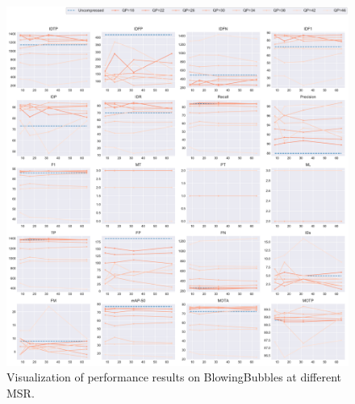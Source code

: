 \begin{figure}[!htbp]
\centering
\includegraphics[width=1.0\linewidth]{img/appendix/BlowingBubbles_all_multiplots_msr.pdf}
\caption[Visualization of performance results on BlowingBubbles at different MSR]
{Visualization of performance results on BlowingBubbles at different MSR.}
\label{fig:BlowingBubbles_all_msr}
\end{figure}



